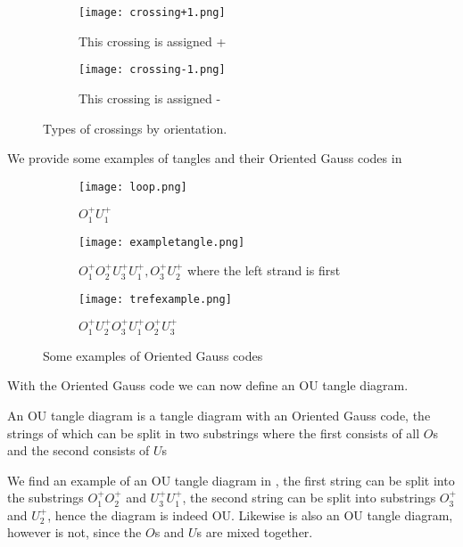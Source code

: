 \begin{figure}[h!]
\centering
\begin{subfigure}{0.20\textwidth}
\centering
\texttt{[image: crossing+1.png]}
\caption{This crossing is assigned +}
\label{fig:crossing:+1}
\end{subfigure}
\hspace{1cm}
\begin{subfigure}{0.20\textwidth}
\centering
\texttt{[image: crossing-1.png]}
\caption{This crossing is assigned -}
\label{fig:crossing:-1}
\end{subfigure}
\caption{Types of crossings by orientation.}
\label{fig:crossing}
\end{figure}

We provide some examples of tangles and their Oriented Gauss codes in 

\begin{figure}[h!]
\centering
\begin{subfigure}{0.31\textwidth}
\centering
\texttt{[image: loop.png]}
\caption{$O^{+}_1U^{+}_1$}
\label{fig:loop}
\end{subfigure}
\hfill
\begin{subfigure}{0.31\textwidth}
\centering
\texttt{[image: exampletangle.png]}
\caption{$O_1^+O_2^+U_3^+U_1^+,O_3^+U_2^+$ where the left strand is first}
\label{fig:exampletangle}
\end{subfigure}
\hfill
\begin{subfigure}{0.31\textwidth}
\centering
\texttt{[image: trefexample.png]}
\caption{$O_1^+U_2^+O_3^+U_1^+O_2^+U_3^+$}
\label{fig:trefexample}
\end{subfigure}
\caption{Some examples of Oriented Gauss codes}
\label{fig:Gaussexamples}
\end{figure}

With the Oriented Gauss code we can now define an OU tangle diagram.

\begin{definition}
An OU tangle diagram is a tangle diagram with an Oriented Gauss code, the strings of which can be split in two substrings where the first consists of all $O$s and the second consists of $U$s
\end{definition}

We find an example of an OU tangle diagram in , the first string can be split into the substrings $O_1^+O_2^+$ and $U_3^+U_1^+$, the second string can be split into substrings $O_3^+$ and $U_2^+$, hence the diagram is indeed OU. Likewise  is also an OU tangle diagram, however  is not, since the $O$s and $U$s are mixed together.
